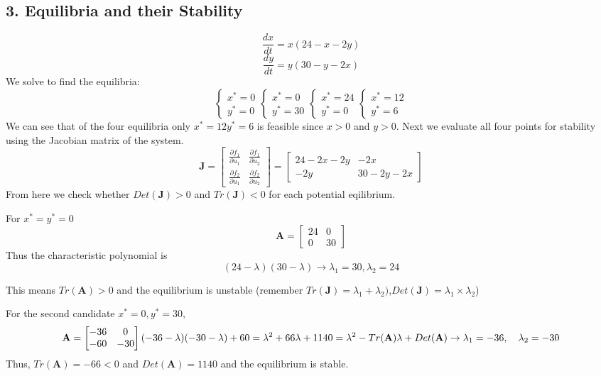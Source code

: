 \documentclass[
]{article}
\begin{document}
\hypertarget{equilibria-and-their-stability}{%
\subsection{3. Equilibria and their
Stability}\label{equilibria-and-their-stability}}

\[ \frac{dx}{dt}=x(24-x-2y)\] \[ \frac{dy}{dt} = y(30-y-2x)\] We solve
to find the equilibria: \[
\begin{cases} 
x^*= 0 \\
y^*= 0
\end{cases}
\begin{cases} 
x^*= 0 \\
y^*= 30
\end{cases}\begin{cases} 
x^*= 24 \\
y^*= 0
\end{cases}
\begin{cases} 
x^*= 12 \\
y^*= 6
\end{cases}
\] We can see that of the four equilibria only \(x^*= 12 y^*= 6\) is
feasible since \(x>0\) and \(y>0\). Next we evaluate all four points for
stability using the Jacobian matrix of the system. \[
\mathbf{J} = 
\begin{bmatrix}
\displaystyle \frac{\partial f_1}{\partial u_1} & \displaystyle \frac{\partial f_1}{\partial u_2}\\
\displaystyle \frac{\partial f_2}{\partial u_1} & \displaystyle \frac{\partial f_2}{\partial u_2}
\end{bmatrix} = 
\begin{bmatrix}
24-2x-2y & -2x \\ 
-2y & 30-2y-2x
\end{bmatrix}
\] From here we check whether \(Det(\mathbf{J})>0\) and
\(Tr(\mathbf{J})<0\) for each potential eqilibrium.

For \(x^*=y^*=0\) \[
\mathbf{A} = 
\begin{bmatrix}
24 & 0 \\ 
0 & 30
\end{bmatrix}
\] Thus the characteristic polynomial is \[
(24-\lambda)(30-\lambda) \rightarrow \lambda_1 = 30, \lambda_2 =24
\]

This means \(Tr(\mathbf{A})>0\) and the equilibrium is unstable
(remember
\(Tr(\mathbf{J})=\lambda_1+\lambda_2)\),\(Det(\mathbf{J}) =\lambda_1\times\lambda_2\))

For the second candidate \(x^*= 0, y^*= 30\), \[
\mathbf{A}= 
\begin{bmatrix}
-36 & 0 \\ 
-60 & -30
\end{bmatrix}\\
(-36-\lambda)(-30-\lambda)+60 = \lambda^2+66\lambda+1140
= \lambda^2 -Tr(\mathbf{A})\lambda + Det(\mathbf{A})\\
 \rightarrow \lambda_1=-36,\quad \lambda_2=-30
\] Thus, \(Tr(\mathbf{A})=-66<0\) and \(Det(\mathbf{A})=1140\) and the
equilibrium is stable.
\end{document}
